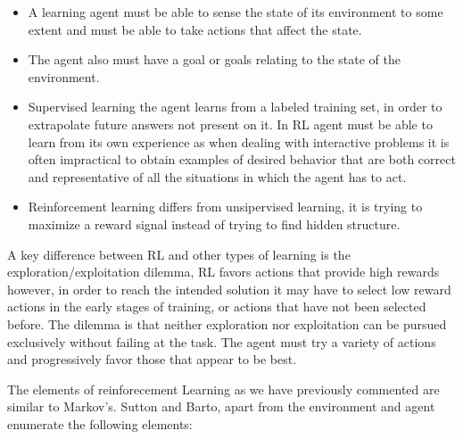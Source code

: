 \begin{itemize}
    \item A learning agent must be able to sense the state of its environment to some extent and must be able to take actions that affect the state.
    \item The agent also must have a goal or goals relating to the state of the environment.
    \item Supervised learning the agent learns from a labeled training set, in order to extrapolate future answers not present on it. In RL agent must be able to learn from its own experience as when dealing with interactive problems it is often impractical to obtain examples of desired behavior that are both correct and representative of all the situations in which the agent has to act.
    \item Reinforcement learning differs from unsipervised learning, it is trying to maximize a reward signal instead of trying to find hidden structure.
\end{itemize}

A key difference between RL and other types of learning is the exploration/exploitation dilemma, RL favors actions that provide high rewards however, in order to reach the intended solution it may have to select low reward actions in the early stages of training, or actions that have not been selected before. The dilemma is that neither exploration nor exploitation can be pursued exclusively without failing at the task. The agent must try a variety of actions and progressively favor those that appear to be best.

The elements of reinforecement Learning as we have previously commented are similar to Markov's. Sutton and Barto\cite{}, apart from the environment and agent enumerate the following elements:

